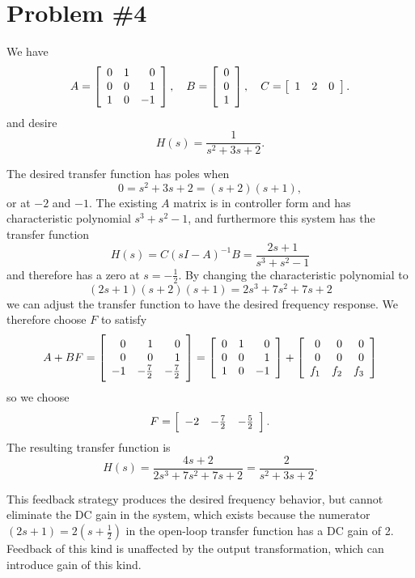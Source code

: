 \documentclass{article}
\begin{document}
\pagebreak

\section*{Problem \#4}
We have
$$
A =
\left[\begin{array}{r r r}
  0 & 1 &  0 \\
  0 & 0 &  1 \\
  1 & 0 & -1
\end{array}\right], \quad
B =
\left[\begin{array}{r}
  0 \\
  0 \\
  1
\end{array}\right], \quad
C =
\left[\begin{array}{r r r}
  1 & 2 &  0
\end{array}\right].
$$
and desire
$$
H(s) = \frac{1}{s^2 + 3s + 2}.
$$

The desired transfer function has poles when
$$
0 = s^2 + 3s + 2 = (s + 2)(s + 1),
$$
or at $-2$ and $-1$. The existing $A$ matrix is in controller form and
has characteristic polynomial $s^3 + s^2 - 1$, and furthermore this
system has the transfer function
$$
H(s) = C (sI - A)^{-1} B =
\frac{2s + 1}{s^3 + s^2 - 1}
$$
and therefore has a zero at $s = -\frac{1}{2}$. By changing the
characteristic polynomial to
$$
(2s + 1)(s + 2)(s + 1) = 2s^3 + 7s^2 + 7s + 2
$$
we can adjust the transfer function to have the desired frequency
response. We therefore choose $F$ to satisfy
$$
A + BF =
\left[\begin{array}{r r r}
   0 &            1 &            0 \\
   0 &            0 &            1 \\
  -1 & -\frac{7}{2} & -\frac{7}{2}
\end{array}\right]
=
\left[\begin{array}{r r r}
  0 & 1 &  0 \\
  0 & 0 &  1 \\
  1 & 0 & -1
\end{array}\right]
+
\left[\begin{array}{r r r}
  0   &   0 &  0 \\
  0   &   0 &  0 \\
  f_1 & f_2 & f_3
\end{array}\right]
$$
so we choose
$$
F =
\left[\begin{array}{r r r}
  -2 & -\frac{7}{2} & -\frac{5}{2}
\end{array}\right].
$$
The resulting transfer function is
$$
H(s) = \frac{4s + 2}{2s^3 + 7s^2 + 7s + 2}
     = \frac{2}{s^2 + 3s + 2}.
$$

This feedback strategy produces the desired frequency behavior, but
cannot eliminate the DC gain in the system,
which exists because the numerator $(2s + 1) = 2(s + \frac{1}{2})$ in the open-loop
transfer function has a DC gain of 2. Feedback of this kind is
unaffected by the output transformation, which can introduce gain of
this kind.
\end{document}
